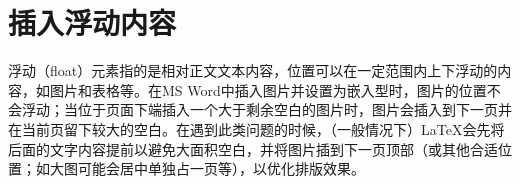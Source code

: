 %
%
%
%
%
%
%

\chapter{插入浮动内容}

浮动（float）元素指的是相对正文文本内容，位置可以在一定范围内上下浮动的内容，如图片和表格等。在MS Word中插入图片并设置为嵌入型时，图片的位置不会浮动；当位于页面下端插入一个大于剩余空白的图片时，图片会插入到下一页并在当前页留下较大的空白。在遇到此类问题的时候，（一般情况下）\LaTeX 会先将后面的文字内容提前以避免大面积空白，并将图片插到下一页顶部（或其他合适位置；如大图可能会居中单独占一页等），以优化排版效果。




